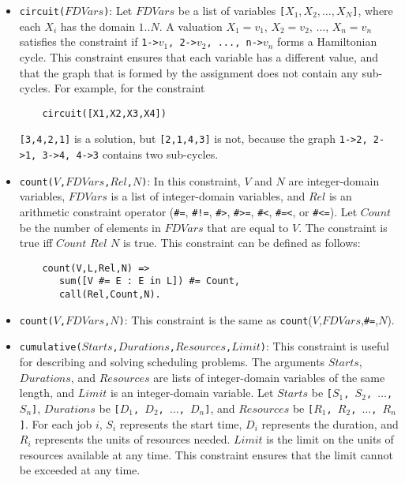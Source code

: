 \begin{itemize}
\item \texttt{circuit($FDVars$)}: Let $FDVars$ be a list of variables \texttt{[$X_1,X_2,\ldots,X_N$]}, where each \texttt{$X_i$} has the domain $1..N$. A valuation $X_1=v_1$, $X_2=v_2$, $\ldots$, $X_n=v_n$ satisfies the constraint if \texttt{1->$v_1$, 2->$v_2$, ..., n->$v_n$} forms a Hamiltonian cycle. This constraint ensures that each variable has a different value, and that the graph that is formed by the assignment does not contain any sub-cycles. For example, for the constraint 
\begin{verbatim}
    circuit([X1,X2,X3,X4])
\end{verbatim}
\texttt{[3,4,2,1]} is a solution, but \texttt{[2,1,4,3]} is not, because the graph \texttt{1->2, 2->1, 3->4, 4->3} contains two sub-cycles.
\item \texttt{count($V$,$FDVars$,$Rel$,$N$)}:  In this constraint, $V$ and $N$ are integer-domain variables, $FDVars$ is a list of integer-domain variables, and $Rel$ is an arithmetic constraint operator (\verb+#=+,  \verb+#!=+,  \verb+#>+,  \verb+#>=+,  \verb+#<+,  \verb+#=<+, or \verb+#<=+). Let $Count$ be the number of elements in $FDVars$ that are equal to $V$. The constraint is true iff $Count$ $Rel$ $N$ is true. This constraint can be defined as follows:
\begin{verbatim}
    count(V,L,Rel,N) =>
       sum([V #= E : E in L]) #= Count,
       call(Rel,Count,N).
\end{verbatim}
\item \texttt{count($V$,$FDVars$,$N$)}: This constraint is the same as \texttt{count}($V$,$FDVars$,\verb+#=+,$N$).

\item \texttt{cumulative($Starts$,$Durations$,$Resources$,$Limit$)}: This constraint is useful for describing and solving scheduling problems. The arguments $Starts$, $Durations$, and $Resources$ are lists of integer-domain variables of the same length, and $Limit$ is an integer-domain variable. Let $Starts$ be \texttt{[$S_1$, $S_2$, $\ldots$, $S_n$]}, $Durations$ be \texttt{[$D_1$, $D_2$, $\ldots$, $D_n$]}, and $Resources$ be \texttt{[$R_1$, $R_2$, $\ldots$, $R_n$]}. For each job \texttt{$i$}, \texttt{$S_i$} represents the start time, \texttt{$D_i$} represents the duration, and \texttt{$R_i$} represents the units of resources needed. $Limit$ is the limit on the units of resources available at any time. This constraint ensures that the limit cannot be exceeded at any time.


\end{itemize}
